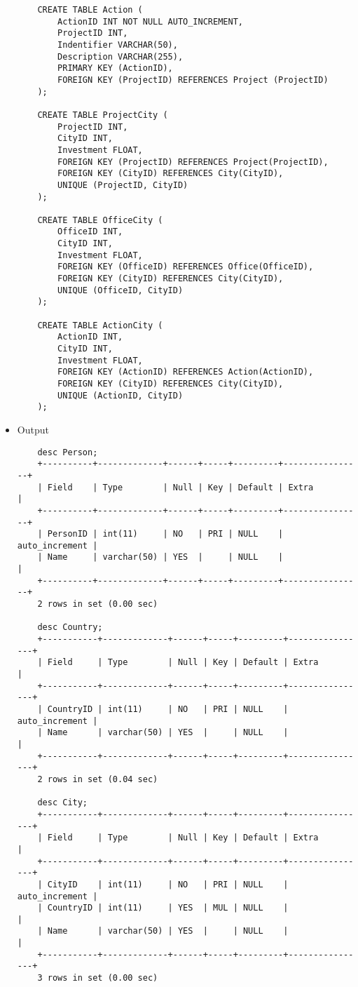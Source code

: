 \documentclass[13pt,a4paper]{report}
\begin{document}
\begin{itemize}
\begin{lstlisting}
	CREATE TABLE Action ( 
		ActionID INT NOT NULL AUTO_INCREMENT, 
		ProjectID INT,
		Indentifier VARCHAR(50), 
		Description VARCHAR(255), 
		PRIMARY KEY (ActionID),
		FOREIGN KEY (ProjectID) REFERENCES Project (ProjectID)
	);

	CREATE TABLE ProjectCity ( 
		ProjectID INT, 
		CityID INT,
		Investment FLOAT,
		FOREIGN KEY (ProjectID) REFERENCES Project(ProjectID), 
		FOREIGN KEY (CityID) REFERENCES City(CityID),
		UNIQUE (ProjectID, CityID)
	);

	CREATE TABLE OfficeCity ( 
		OfficeID INT, 
		CityID INT,
		Investment FLOAT,
		FOREIGN KEY (OfficeID) REFERENCES Office(OfficeID), 
		FOREIGN KEY (CityID) REFERENCES City(CityID),
		UNIQUE (OfficeID, CityID)
	);

	CREATE TABLE ActionCity ( 
		ActionID INT, 
		CityID INT,
		Investment FLOAT,
		FOREIGN KEY (ActionID) REFERENCES Action(ActionID), 
		FOREIGN KEY (CityID) REFERENCES City(CityID),
		UNIQUE (ActionID, CityID)
	);
\end{lstlisting}
\item Output
\begin{lstlisting}
	desc Person;
	+----------+-------------+------+-----+---------+----------------+
	| Field    | Type        | Null | Key | Default | Extra          |
	+----------+-------------+------+-----+---------+----------------+
	| PersonID | int(11)     | NO   | PRI | NULL    | auto_increment |
	| Name     | varchar(50) | YES  |     | NULL    |                |
	+----------+-------------+------+-----+---------+----------------+
	2 rows in set (0.00 sec)

	desc Country;
	+-----------+-------------+------+-----+---------+----------------+
	| Field     | Type        | Null | Key | Default | Extra          |
	+-----------+-------------+------+-----+---------+----------------+
	| CountryID | int(11)     | NO   | PRI | NULL    | auto_increment |
	| Name      | varchar(50) | YES  |     | NULL    |                |
	+-----------+-------------+------+-----+---------+----------------+
	2 rows in set (0.04 sec)

	desc City;
	+-----------+-------------+------+-----+---------+----------------+
	| Field     | Type        | Null | Key | Default | Extra          |
	+-----------+-------------+------+-----+---------+----------------+
	| CityID    | int(11)     | NO   | PRI | NULL    | auto_increment |
	| CountryID | int(11)     | YES  | MUL | NULL    |                |
	| Name      | varchar(50) | YES  |     | NULL    |                |
	+-----------+-------------+------+-----+---------+----------------+
	3 rows in set (0.00 sec)


\end{lstlisting}
\end{itemize}
\end{document}
